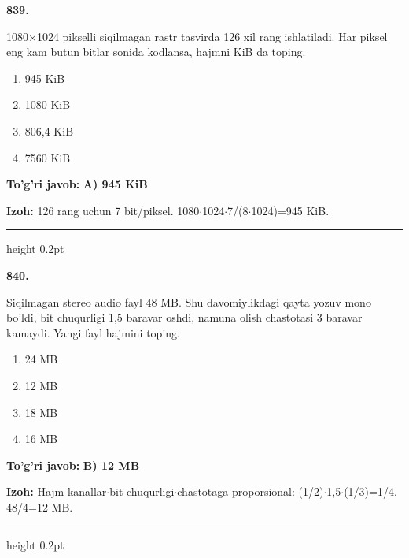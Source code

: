 \documentclass[10pt,a4paper,oneside]{article}
\begin{document}
\noindent\textbf{\color{ink}839.}
\par
1080\ensuremath{\times}1024 pikselli siqilmagan rastr tasvirda 126 xil rang ishlatiladi. Har piksel eng kam butun bitlar sonida kodlansa, hajmni KiB da toping.
\begin{enumerate}[label=\Alph*),leftmargin=9mm]
\item 945 KiB
\item 1080 KiB
\item 806,4 KiB
\item 7560 KiB
\end{enumerate}
\begin{tcolorbox}[enhanced,breakable,colback=teal!4,colframe=teal!50!black,boxrule=0.5pt,arc=1.1mm,left=3mm,right=3mm,top=1.7mm,bottom=1.7mm,before skip=2mm,after skip=2mm]
\textbf{\color{teal}To'g'ri javob:} \textbf{A) 945 KiB}
\par\smallskip
\textbf{Izoh:} 126 rang uchun 7 bit/piksel. 1080\ensuremath{\cdot}1024\ensuremath{\cdot}7/(8\ensuremath{\cdot}1024)=945 KiB.
\end{tcolorbox}
\vspace{2mm}\hrule height 0.2pt \vspace{3mm}

\noindent\textbf{\color{ink}840.}
\par
Siqilmagan stereo audio fayl 48 MB. Shu davomiylikdagi qayta yozuv mono bo'ldi, bit chuqurligi 1,5 baravar oshdi, namuna olish chastotasi 3 baravar kamaydi. Yangi fayl hajmini toping.
\begin{enumerate}[label=\Alph*),leftmargin=9mm]
\item 24 MB
\item 12 MB
\item 18 MB
\item 16 MB
\end{enumerate}
\begin{tcolorbox}[enhanced,breakable,colback=teal!4,colframe=teal!50!black,boxrule=0.5pt,arc=1.1mm,left=3mm,right=3mm,top=1.7mm,bottom=1.7mm,before skip=2mm,after skip=2mm]
\textbf{\color{teal}To'g'ri javob:} \textbf{B) 12 MB}
\par\smallskip
\textbf{Izoh:} Hajm kanallar\ensuremath{\cdot}bit chuqurligi\ensuremath{\cdot}chastotaga proporsional: (1/2)\ensuremath{\cdot}1,5\ensuremath{\cdot}(1/3)=1/4. 48/4=12 MB.
\end{tcolorbox}
\vspace{2mm}\hrule height 0.2pt \vspace{3mm}
\end{document}
